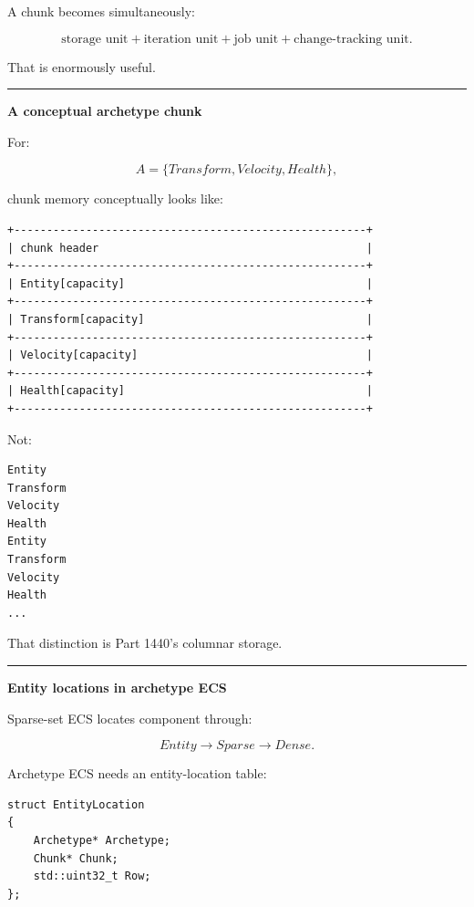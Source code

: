 A chunk becomes simultaneously:

\[
\boxed{
\text{storage unit}
+
\text{iteration unit}
+
\text{job unit}
+
\text{change-tracking unit}.
}
\]

That is enormously useful.

\begin{center}\rule{0.5\linewidth}{0.5pt}\end{center}

\textbf{A conceptual archetype chunk}

For:

\[
A=\{Transform,Velocity,Health\},
\]

chunk memory conceptually looks like:

\begin{verbatim}
+------------------------------------------------------+
| chunk header                                         |
+------------------------------------------------------+
| Entity[capacity]                                     |
+------------------------------------------------------+
| Transform[capacity]                                  |
+------------------------------------------------------+
| Velocity[capacity]                                   |
+------------------------------------------------------+
| Health[capacity]                                     |
+------------------------------------------------------+
\end{verbatim}

Not:

\begin{verbatim}
Entity
Transform
Velocity
Health
Entity
Transform
Velocity
Health
...
\end{verbatim}

That distinction is Part 1440's columnar storage.

\begin{center}\rule{0.5\linewidth}{0.5pt}\end{center}

\textbf{Entity locations in archetype ECS}

Sparse-set ECS locates component through:

\[
Entity\rightarrow Sparse\rightarrow Dense.
\]

Archetype ECS needs an entity-location table:

\begin{verbatim}
struct EntityLocation
{
    Archetype* Archetype;
    Chunk* Chunk;
    std::uint32_t Row;
};
\end{verbatim}

